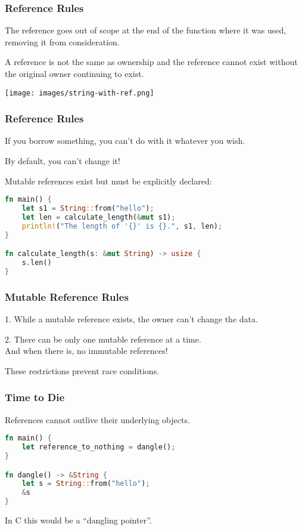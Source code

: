 \begin{frame}
\frametitle{Reference Rules}

The reference goes out of scope at the end of the function where it was used, removing it from consideration. 

A reference is not the same as ownership and the reference cannot exist without the original owner continuing to exist. 

\begin{center}
\texttt{[image: images/string-with-ref.png]}
\end{center}

\end{frame}


\begin{frame}[fragile]
\frametitle{Reference Rules}

If you borrow something, you can't do with it whatever you wish.

By default, you can't change it! 

Mutable references exist but must be explicitly declared:

\begin{lstlisting}[language=Rust]
fn main() {
    let s1 = String::from("hello");
    let len = calculate_length(&mut s1);
    println!("The length of '{}' is {}.", s1, len);
}

fn calculate_length(s: &mut String) -> usize {
    s.len()
}
\end{lstlisting}


\end{frame}


\begin{frame}
\frametitle{Mutable Reference Rules}

1. While a mutable reference exists, the owner can't change the data.

2. There can be only one mutable reference at a time.\\
\quad And when there is, no immutable references!

These restrictions prevent race conditions.

\end{frame}


\begin{frame}[fragile]
\frametitle{Time to Die}

References cannot outlive their underlying objects.

\begin{lstlisting}[language=Rust]
fn main() {
    let reference_to_nothing = dangle();
}

fn dangle() -> &String {
    let s = String::from("hello");
    &s
}
\end{lstlisting} 

In C this would be a ``dangling pointer''.

\end{frame}


